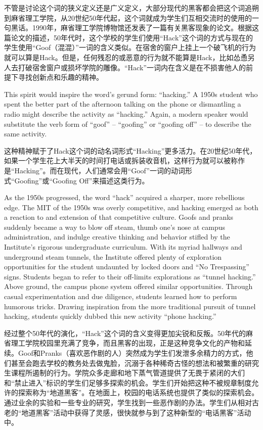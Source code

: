 \ifdefined\chs
不管是讨论这个词的狭义定义还是广义定义，大部分现代的黑客都会把这个词追朔到麻省理工学院，从20世纪50年代起，这个词就成为学生们互相交流时的使用的一句黑话。1990年，麻省理工学院博物馆还发表了一篇有关黑客现象的论文。根据这篇论文的描述，50年代时，这个学校的学生们使用``Hack''这个词的方式与现在的学生使用``Goof（混混）''一词的含义类似。在宿舍的窗户上挂上一个破飞机的行为就可以算是Hack。但是，任何残忍的或恶意的行为就不能算是Hack，比如怂恿另人去打破宿舍窗户或损坏学院的雕像。``Hack''一词内在含义是在不损害他人的前提下寻找创新点和乐趣的精神。
\fi

\ifdefined\eng
This spirit would inspire the word's gerund form: ``hacking.'' A 1950s student who spent the better part of the afternoon talking on the phone or dismantling a radio might describe the activity as ``hacking.'' Again, a modern speaker would substitute the verb form of ``goof'' -- ``goofing'' or ``goofing off'' -- to describe the same activity.
\fi

\ifdefined\chs
这种精神赋于了Hack这个词的动名词形式``Hacking''更多活力。在20世纪50年代，如果一个学生花上大半天的时间打电话或拆装收音机，这样行为就可以被称作是``Hacking''。而在现代，人们通常会用``Goof''一词的动词形式``Goofing''或``Goofing Off''来描述这类行为。
\fi

\ifdefined\eng
As the 1950s progressed, the word ``hack'' acquired a sharper, more rebellious edge. The MIT of the 1950s was overly competitive, and hacking emerged as both a reaction to and extension of that competitive culture. Goofs and pranks suddenly became a way to blow off steam, thumb one's nose at campus administration, and indulge creative thinking and behavior stifled by the Institute's rigorous undergraduate curriculum. With its myriad hallways and underground steam tunnels, the Institute offered plenty of exploration opportunities for the student undaunted by locked doors and ``No Trespassing'' signs. Students began to refer to their off-limits explorations as ``tunnel hacking.'' Above ground, the campus phone system offered similar opportunities. Through casual experimentation and due diligence, students learned how to perform humorous tricks. Drawing inspiration from the more traditional pursuit of tunnel hacking, students quickly dubbed this new activity ``phone hacking.''
\fi

\ifdefined\chs
经过整个50年代的演化，``Hack''这个词的含义变得更加尖锐和反叛。50年代的麻省理工学院校园里充满了竞争，而且黑客的出现，正是这种竞争文化的产物和延续。Goof和Pranks（喜欢恶作剧的人）突然成为学生们发泄多余精力的方式，他们甚至会跑去学校的教务处去做鬼脸，沉溺于各种稀奇古怪的想法和被繁重的研究生课程所遏制的行为。学院众多走廊和地下蒸气管道提供了无畏于紧闭的大们和``禁止进入''标识的学生们足够多探索的机会。学生们开始把这种不被规章制度允许的探索称为``地道黑客''。在地面上，校园的电话系统也提供了类似的探索机会。通过业余的实验和一些专业的研究，学生找到一些恶作剧的办法。学生们从相对古老的``地道黑客''活动中获得了灵感，很快就参与到了这种新型的``电话黑客''活动中。
\fi

